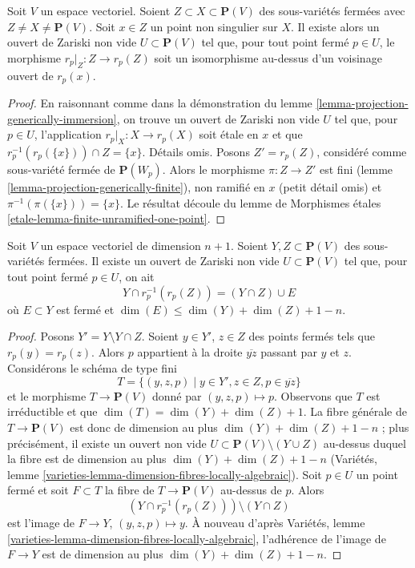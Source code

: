 \begin{lemma}
\label{lemma-projection-generically-immersion-refined}
Soit $V$ un espace vectoriel. Soient $Z \subset X \subset \mathbf{P}(V)$ des
sous-variétés fermées avec $Z \not = X \not = \mathbf{P}(V)$. Soit $x \in Z$ un point
non singulier sur $X$. Il existe alors un ouvert de Zariski non vide
$U \subset \mathbf{P}(V)$ tel que, pour tout point fermé $p \in U$, le
morphisme $r_p|_Z : Z \to r_p(Z)$ soit un isomorphisme au-dessus d'un voisinage ouvert
de $r_p(x)$.
\end{lemma}

\begin{proof}
En raisonnant comme dans la démonstration du lemme \ref{lemma-projection-generically-immersion},
on trouve un ouvert de Zariski non vide $U$ tel que, pour $p \in U$, l'application
$r_p|_X : X \to r_p(X)$ soit \'etale en $x$ et que
$r_p^{-1}(r_p(\{x\})) \cap Z = \{x\}$. Détails omis.
Posons $Z' = r_p(Z)$, considéré comme sous-variété fermée de $\mathbf{P}(W_p)$.
Alors le morphisme $\pi : Z \to Z'$ est fini
(lemme \ref{lemma-projection-generically-finite}), non ramifié en $x$
(petit détail omis) et $\pi^{-1}(\pi(\{x\})) = \{x\}$. Le résultat découle
du lemme de Morphismes \'etales \ref{etale-lemma-finite-unramified-one-point}.
\end{proof}

\begin{lemma}
\label{lemma-projection-injective}
Soit $V$ un espace vectoriel de dimension $n + 1$.
Soient $Y, Z \subset \mathbf{P}(V)$ des sous-variétés fermées.
Il existe un ouvert de Zariski non vide $U \subset \mathbf{P}(V)$
tel que, pour tout point fermé $p \in U$, on ait
$$
Y \cap r_p^{-1}(r_p(Z)) = (Y \cap Z) \cup E
$$
où $E \subset Y$ est fermé et
$\dim(E) \leq \dim(Y) + \dim(Z) + 1 - n$.
\end{lemma}

\begin{proof}
Posons $Y' = Y \setminus Y \cap Z$.
Soient $y \in Y'$, $z \in Z$ des points fermés tels que $r_p(y) = r_p(z)$.
Alors $p$ appartient à la droite $\overline{yz}$ passant par $y$ et $z$.
Considérons le schéma de type fini
$$
T = \{(y, z, p) \mid y \in Y', z \in Z, p \in \overline{yz}\}
$$
et le morphisme $T \to \mathbf{P}(V)$ donné par $(y, z, p) \mapsto p$.
Observons que $T$ est irréductible et que $\dim(T) = \dim(Y) + \dim(Z) + 1$.
La fibre générale de $T \to \mathbf{P}(V)$ est donc de dimension au plus
$\dim(Y) + \dim(Z) + 1 - n$ ; plus précisément, il existe un ouvert non vide
$U \subset \mathbf{P}(V) \setminus (Y \cup Z)$ au-dessus
duquel la fibre est de dimension au plus $\dim(Y) + \dim(Z) + 1 - n$
(Variétés, lemme \ref{varieties-lemma-dimension-fibres-locally-algebraic}).
Soit $p \in U$ un point fermé et soit $F \subset T$ la fibre
de $T \to \mathbf{P}(V)$ au-dessus de $p$. Alors
$$
(Y \cap r_p^{-1}(r_p(Z))) \setminus (Y \cap Z)
$$
est l'image de $F \to Y$, $(y, z, p) \mapsto y$. À nouveau d'après
Variétés, lemme \ref{varieties-lemma-dimension-fibres-locally-algebraic},
l'adhérence de l'image de $F \to Y$ est de dimension au plus
$\dim(Y) + \dim(Z) + 1 - n$.
\end{proof}

